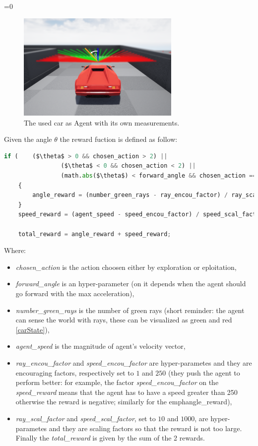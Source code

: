\documentclass[14pt]{extarticle}
\newcounter{debug}
\begin{document}
\begin{flushleft}
\ifnum\value{debug}=0 {
\begin{figure}[H] \label{carAngle}
    		\centering\includegraphics[width=0.7\textwidth]{./Image/RF/carAngle2.png}
		\vspace{5mm}
    		\caption{The used car as Agent with its own measurements.}
	\end{figure}
} \fi
	Given the angle $\theta$ the reward fuction is defined as follow:
\begin{lstlisting}[mathescape=true, language=Python]
	if (	($\theta$ > 0 && chosen_action > 2) ||
				($\theta$ < 0 && chosen_action < 2) ||
				(math.abs($\theta$) < forward_angle && chosen_action == 2))
	{
		angle_reward = (number_green_rays - ray_encou_factor) / ray_scal_factor;
	}
	speed_reward = (agent_speed - speed_encou_factor) / speed_scal_factor;
	
	total_reward = angle_reward + speed_reward;
\end{lstlisting}
	Where:
	\begin{itemize}
	\item \emph{chosen\_action} is the action choosen either by exploration or eploitation,
	\item \emph{forward\_angle} is an hyper-parameter (on it depends when the agent should go forward with the max acceleration),
	\item \emph{number\_green\_rays} is the number of green rays (short reminder: the agent can sense the world with rays, these can be visualized as green and red \ref{carState}),
	\item \emph{agent\_speed} is the magnitude of agent's velocity vector, 
	\item \emph{ray\_encou\_factor} and \emph{speed\_encou\_factor} are hyper-parametes and they are encouraging factors, respectively set to $1$ and $250$ (they push the agent to perform better: for example, the factor \emph{speed\_encou\_factor} on the \emph{speed\_reward} means that the agent has to have a speed greater than 250 otherwise the reward is negative; similarly for the emph{angle\_reward}), 
\item \emph{ray\_scal\_factor} and \emph{speed\_scal\_factor}, set to $10$ and $1000$, are hyper-parametes and they are scaling factors so that the reward is not too large. Finally the \emph{total\_reward} is given by the sum of the 2 rewards.
	\end{itemize}
	

\end{flushleft}
\end{document}
